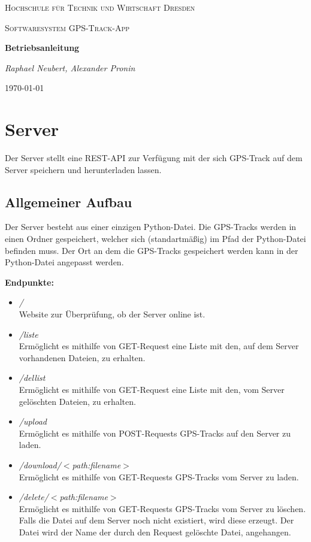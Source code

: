 \documentclass{article}
\begin{document}
\begin{titlepage}
    \centering
    {\scshape\LARGE Hochschule für Technik und Wirtschaft Dresden \par}
    \vspace{1cm}
    {\scshape\Large Softwaresystem \glqq GPS-Track-App\grqq\par}
    \vspace{1.5cm}
    {\huge\bfseries Betriebsanleitung\par}
    \vspace{2cm}
    {\Large\itshape Raphael Neubert, Alexander Pronin \par}
    \vfill

    {\large \today\par}
\end{titlepage}

\tableofcontents
\newpage

\section{Server}
Der Server stellt eine REST-API zur Verfügung mit der sich GPS-Track auf dem Server 
speichern und herunterladen lassen.
\subsection{Allgemeiner Aufbau}
Der Server besteht aus einer einzigen Python-Datei.
Die GPS-Tracks werden in einen Ordner  gespeichert,
welcher sich (standartmäßig) im Pfad der Python-Datei befinden muss.
Der Ort an dem die GPS-Tracks gespeichert werden kann in der Python-Datei
angepasst werden. \\ \par
\textbf{Endpunkte:}
\begin{itemize}
    \item \textit{/} \\ Website zur Überprüfung, ob der Server online ist.
    \item \textit{/liste} \\ Ermöglicht es mithilfe von GET-Request eine Liste
        mit den, auf dem Server vorhandenen Dateien, zu erhalten.
    \item \textit{/dellist} \\ Ermöglicht es 
        mithilfe von GET-Request eine Liste
        mit den, vom Server gelöschten Dateien, zu erhalten.
    \item \textit{/upload} \\  Ermöglicht es mithilfe von POST-Requests GPS-Tracks 
        auf den Server zu laden.
    \item \textit{/download/}$<$\textit{path:filename}$>$ \\  Ermöglicht es mithilfe
        von GET-Requests GPS-Tracks vom Server zu laden.
    \item \textit{/delete/}$<$\textit{path:filename}$>$  \\
        Ermöglicht es mithilfe von GET-Requests GPS-Tracks 
        vom Server zu löschen. Falls die Datei  auf dem Server noch
        nicht existiert, wird diese erzeugt. Der Datei  wird 
        der Name der durch den Request gelöschte Datei, angehangen.
\end{itemize}
\end{document}
